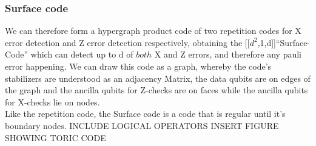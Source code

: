 \subsubsection{Surface code}
We can therefore form a hypergraph product code of two repetition
codes for X error detection and Z error detection respectively,
obtaining the [[$d^2$,1,d]]``Surface-Code'' which can detect up
to d of $both$ X and Z errors, and 
therefore any pauli error happening.
We can draw this code as a graph, whereby the code's stabilizers
are understood as an adjacency Matrix, the data qubits are on 
edges of the graph and the ancilla qubits for Z-checks are on faces
while the ancilla qubits for X-checks lie on nodes.\\
Like the repetition code, the Surface code is a code that is regular until
it's boundary nodes.
INCLUDE LOGICAL OPERATORS
INSERT FIGURE SHOWING TORIC CODE